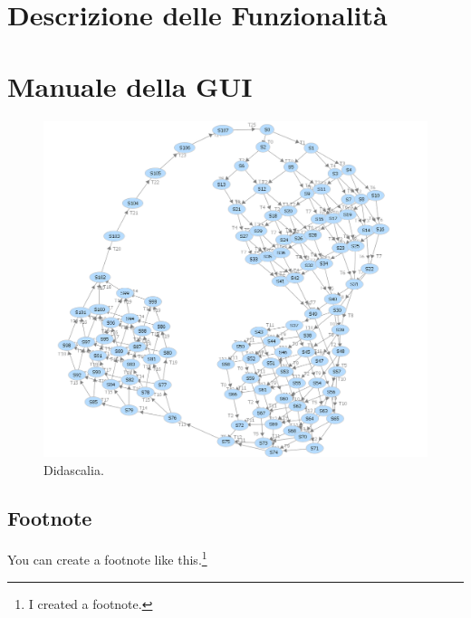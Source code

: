 \documentclass{FR16}
\begin{document}
\section{Descrizione delle Funzionalità}


\section{Manuale della GUI}
\begin{figure}[H]
\centering
\includegraphics[width=1\textwidth]{grafo.png}
\caption{\label{fig:1}Didascalia.}
\end{figure}
\subsection{Footnote}
You can create a footnote like this.\footnote{I created a footnote.}
\end{document}
